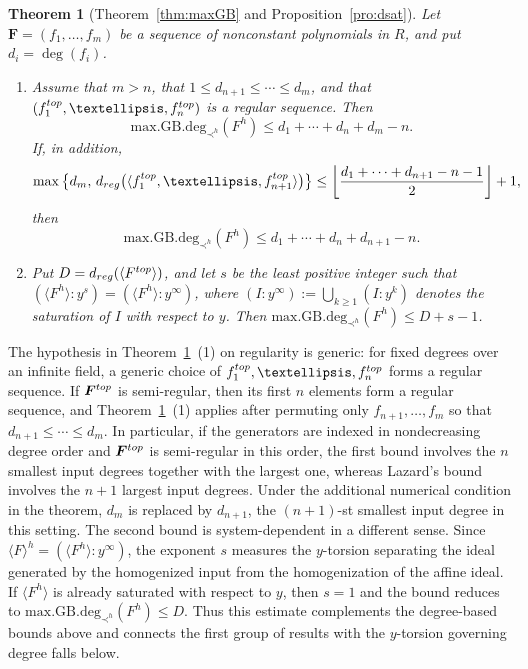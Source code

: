 \documentclass{article}
\theoremstyle{definition}
\theoremstyle{plain}
\newtheorem{theor}{Theorem}
\theoremstyle{plain}
\theoremstyle{plain}
\theoremstyle{plain}
\numberwithin{equation}{subsection}
\begin{document}
\begin{theor}[Theorem~\ref{thm:maxGB} and
Proposition~\ref{pro:dsat}]\label{thm:mainB}
Let $\bm F=(f_1,\ldots,f_m)$ be a sequence of nonconstant polynomials
in $R$, and put $d_i=\deg (f_i)$.
\begin{enumerate}
\item[(1)] Assume that $m>n$, that $1\le d_{n+1}\le\cdots\le d_m$, and that $(f_1^{\rm top},\ldots,f_n^{\rm top})$ is a regular sequence.
Then
\[
\mathrm{max.GB.deg}_{\prec^h}(F^h) \le d_1+\cdots+d_n+d_m-n.
\]
If, in addition,
\[
\max\left\{
d_m,\,
d_{\rm reg}
\bigl(\langle f_1^{\rm top},\ldots,f_{n+1}^{\rm top}\rangle\bigr)
\right\}
\le
\left\lfloor
\frac{d_1+\cdots+d_{n+1}-n-1}{2}
\right\rfloor+1,
\]
then
\[
\mathrm{max.GB.deg}_{\prec^h}(F^h)
\le
d_1+\cdots+d_n+d_{n+1}-n.
\]

\item[(2)] Put $D=d_{\rm reg}(\langle F^{\rm top}\rangle)$, and let $s$ be the least positive integer such that $(\langle F^h\rangle:y^s)=(\langle F^h\rangle:y^\infty)$, where $(I:y^\infty):=\bigcup_{k\geq1}(I:y^k)$ denotes the saturation of $I$ with respect to $y$.
Then $\mathrm{max.GB.deg}_{\prec^h}(F^h)\le D+s-1$.
\end{enumerate}
\end{theor}

The hypothesis in Theorem~\ref{thm:mainB}~{\rm (1)} on regularity is generic:
for fixed degrees over an infinite field, a generic choice of $f_1^{\rm top},\ldots,f_n^{\rm top}$ forms a regular sequence.
If $\bm F^{\rm top}$ is semi-regular, then its first $n$ elements form a regular sequence, and Theorem~\ref{thm:mainB}~{\rm (1)} applies after permuting only $f_{n+1},\ldots,f_m$ so that $d_{n+1}\leq\cdots\leq d_m$.
In particular, if the generators are indexed in nondecreasing degree order and $\bm F^{\rm top}$ is semi-regular in this order, the first bound involves the $n$ smallest input degrees together with the largest one, whereas Lazard's bound involves the $n+1$ largest input degrees.
Under the additional numerical condition in the theorem, $d_m$ is replaced by $d_{n+1}$, the $(n+1)$-st smallest input degree in this setting.
The second bound is system-dependent in a different sense.
Since $\langle F\rangle^h=(\langle F^h\rangle:y^\infty)$, the exponent $s$ measures the $y$-torsion separating the ideal generated by the homogenized input from the homogenization of the affine ideal.
If $\langle F^h\rangle$ is already saturated with respect to $y$, then $s=1$ and the bound reduces to $\mathrm{max.GB.deg}_{\prec^h}(F^h)\leq D$.
Thus this estimate complements the degree-based bounds above and connects the first group of results with the $y$-torsion governing degree falls below.
\end{document}
